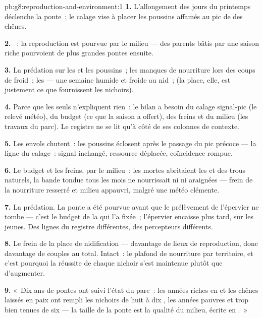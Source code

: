 \begin{solution}{pb:g8:reproduction-and-environment:1}
\textbf{1.} L'allongement des jours du printemps déclenche la ponte~;
le calage vise à placer les poussins affamés au pic de  des
chênes.

\textbf{2.} ~: la
reproduction est pourvue par le milieu --- des parents bâtis par une
saison riche pourvoient de plus grandes pontes ensuite.

\textbf{3.} La prédation sur les  et les poussins~; les manques
de nourriture lors des coups de froid~; les  --- une
semaine humide et froide au nid~; (la place, elle, est justement ce
que fournissent les nichoirs).

\textbf{4.} Parce que les  seuls n'expliquent rien~: le bilan a
besoin du calage signal-pic (le relevé météo), du budget (ce que la
saison a offert), des freins et du milieu (les travaux du parc). Le
registre ne se lit qu'à côté de ses colonnes de contexte.

\textbf{5.} Les envols chutent~: les poussins éclosent après le
passage du pic précoce --- la ligne du calage~: signal inchangé,
ressource déplacée, coïncidence rompue.

\textbf{6.} Le budget et les freins, par le milieu~: les 
mortes abritaient les  et des trous naturels, la bande tondue
tous les mois ne nourrissait ni  ni araignées --- frein de
la nourriture resserré et milieu appauvri, malgré une météo
clémente.

\textbf{7.} La prédation. La ponte a été pourvue avant que le
prélèvement de l'épervier ne tombe --- c'est le budget de la 
qui l'a fixée~; l'épervier encaisse plus tard, sur les jeunes. Des
lignes du registre différentes, des percepteurs différents.

\textbf{8.} Le frein de la place de nidification --- davantage de
lieux de reproduction, donc davantage de couples au total. Intact~:
le plafond de nourriture par territoire, et c'est pourquoi la
réussite de chaque nichoir s'est maintenue plutôt que d'augmenter.

\textbf{9.} «~Dix ans de pontes ont suivi l'état du parc~: les
années riches en  et les chênes laissés en paix ont rempli
les nichoirs de huit à dix , les années pauvres et trop bien
tenues de six --- la taille de la ponte est la qualité du milieu,
écrite en .~»


\end{solution}
